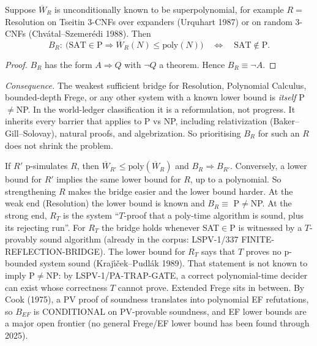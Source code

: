\documentclass[11pt]{article}
\newcommand{\Wbar}{\overline W}
\begin{document}
\begin{proposition}\label{p2}
Suppose $\Wbar_R$ is unconditionally known to be superpolynomial, for example $R=$ Resolution on Tseitin
3-CNFs over expanders (Urquhart 1987) or on random 3-CNFs (Chv\'atal--Szemer\'edi 1988). Then
\[
 B_R:\ \big(\mathrm{SAT}\in\mathrm P\Rightarrow \Wbar_R(N)\le\mathrm{poly}(N)\big)
 \quad\Longleftrightarrow\quad \mathrm{SAT}\notin\mathrm P .
\]
\end{proposition}
\begin{proof}
$B_R$ has the form $A\Rightarrow Q$ with $\neg Q$ a theorem. Hence $B_R\equiv\neg A$.
\end{proof}
\noindent\emph{Consequence.} The weakest sufficient bridge for Resolution, Polynomial Calculus,
bounded-depth Frege, or any other system with a known lower bound is \emph{itself} P${}\ne{}$NP. In the
world-ledger classification it is a reformulation, not progress. It inherits every barrier that applies
to P vs NP, including relativization (Baker--Gill--Solovay), natural proofs, and algebrization.
So prioritising $B_R$ for such an $R$ does not shrink the problem.

\begin{proposition}\label{p3}
If $R'$ p-simulates $R$, then $\Wbar_{R'}\le\mathrm{poly}(\Wbar_R)$ and $B_R\Rightarrow B_{R'}$.
Conversely, a lower bound for $R'$ implies the same lower bound for $R$, up to a polynomial.
So strengthening $R$ makes the bridge easier and the lower bound harder.
At the weak end (Resolution) the lower bound is known and $B_R\equiv$ P${}\neq{}$NP.
At the strong end, $R_T$ is the system ``$T$-proof that a poly-time algorithm is sound, plus its rejecting
run''. For $R_T$ the bridge holds whenever SAT${}\in{}$P is witnessed by a $T$-provably sound algorithm
(already in the corpus: LSPV-1/337 FINITE-REFLECTION-BRIDGE). The lower bound for $R_T$ says that
$T$ proves no p-bounded system sound (Kraj\'{\i}\v{c}ek--Pudl\'ak 1989). That statement is not known
to imply P${}\neq{}$NP: by LSPV-1/PA-TRAP-GATE, a correct polynomial-time decider can exist whose
correctness $T$ cannot prove. Extended Frege sits in between. By Cook (1975), a PV proof of soundness
translates into polynomial EF refutations, so $B_{EF}$ is CONDITIONAL on PV-provable soundness, and EF lower
bounds are a major open frontier (no general Frege/EF lower bound has been found through 2025).
\end{proposition}
\end{document}
